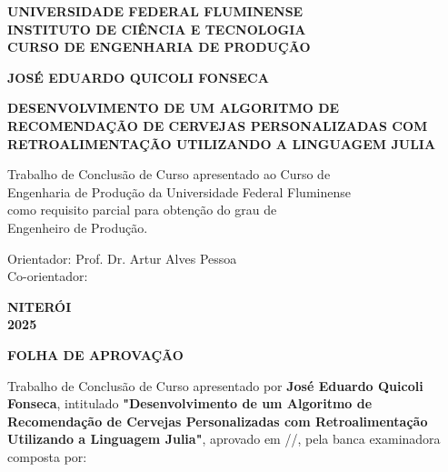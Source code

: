 \documentclass[12pt,a4paper]{article}
\begin{document}
\begin{titlepage}
\begin{center}
\large
\textbf{UNIVERSIDADE FEDERAL FLUMINENSE}\\
\textbf{INSTITUTO DE CIÊNCIA E TECNOLOGIA}\\
\textbf{CURSO DE ENGENHARIA DE PRODUÇÃO}

\vspace{4cm}

\Large
\textbf{JOSÉ EDUARDO QUICOLI FONSECA}

\vspace{3cm}

\Large
\textbf{DESENVOLVIMENTO DE UM ALGORITMO DE RECOMENDAÇÃO DE CERVEJAS PERSONALIZADAS COM RETROALIMENTAÇÃO UTILIZANDO A LINGUAGEM JULIA}

\vspace{3cm}

\large
Trabalho de Conclusão de Curso apresentado ao Curso de\\
Engenharia de Produção da Universidade Federal Fluminense\\
como requisito parcial para obtenção do grau de\\
Engenheiro de Produção.

\vspace{2cm}

\begin{flushleft}
\large
Orientador: Prof. Dr. Artur Alves Pessoa\\
Co-orientador: \underline{\hspace{6cm}}
\end{flushleft}

\vfill

\large
\textbf{NITERÓI}\\
\textbf{2025}
\end{center}
\end{titlepage}

\newpage
\begin{center}
\Large
\textbf{FOLHA DE APROVAÇÃO}
\end{center}

\vspace{2cm}

Trabalho de Conclusão de Curso apresentado por \textbf{José Eduardo Quicoli Fonseca}, intitulado \textbf{"Desenvolvimento de um Algoritmo de Recomendação de Cervejas Personalizadas com Retroalimentação Utilizando a Linguagem Julia"}, aprovado em \underline{\hspace{1cm}}/\underline{\hspace{1cm}}/\underline{\hspace{2cm}}, pela banca examinadora composta por:
\end{document}
